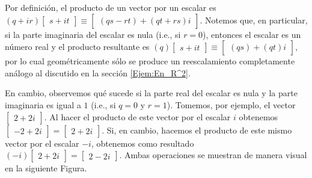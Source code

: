 \documentclass[12pt]{article}
\begin{document}

Por definición, el producto de un vector por un escalar es $(q+ir)\begin{bmatrix}s+it\end{bmatrix}\equiv\begin{bmatrix}(qs-rt)+(qt+rs)i\end{bmatrix}$. Notemos que, en particular, si la parte imaginaria del escalar es nula (i.e., si $r=0$), entonces el escalar es un número real y el producto resultante es $(q)\begin{bmatrix}s+it\end{bmatrix}\equiv\begin{bmatrix}(qs)+(qt)i\end{bmatrix}$, por lo cual geométricamente sólo se produce un reescalamiento completamente análogo al discutido en la sección \ref{Ejem:En_R^2}.


En cambio, observemos qué sucede si la parte real del escalar es nula y la parte imaginaria es igual a $1$ (i.e., si $q=0$ y $r=1$). Tomemos, por ejemplo, el vector $\begin{bmatrix}2+2i\end{bmatrix}$. Al hacer el producto de este vector por el escalar $i$ obtenemos $\begin{bmatrix}-2+2i\end{bmatrix}=\begin{bmatrix}2+2i\end{bmatrix}$. Si, en cambio, hacemos el producto de este mismo vector por el escalar $-i$, obtenemos como resultado $(-i)\begin{bmatrix}2+2i\end{bmatrix}=\begin{bmatrix}2-2i\end{bmatrix}$. Ambas operaciones se muestran de manera visual en la siguiente Figura.

\end{document}
